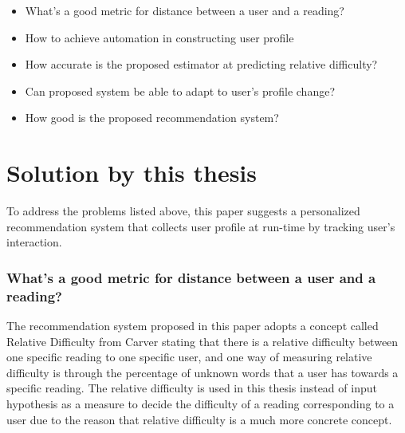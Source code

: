 \begin{itemize}
  \item What's a good metric for distance between a user and a reading?
  \vspace{10pt}
  \item How to achieve automation in constructing user profile
  \vspace{10pt}
  \item How accurate is the proposed estimator at predicting relative difficulty?
  \vspace{10pt}
  \item Can proposed system be able to adapt to user's profile change?
  \vspace{10pt}
  \item How good is the proposed recommendation system?
\end{itemize}

\section{Solution by this thesis}

To address the problems listed above, this paper suggests a personalized recommendation system that collects user profile at run-time by tracking user's interaction. 

\subsubsection{What's a good metric for distance between a user and a reading?}
\vspace{10pt}
The recommendation system proposed in this paper adopts a concept called Relative Difficulty from Carver \cite{Carver1994} stating that there is a relative difficulty between one specific reading to one specific user, and one way of measuring relative difficulty is through the percentage of unknown words that a user has towards a specific reading. The relative difficulty is used in this thesis instead of input hypothesis as a measure to decide the difficulty of a reading corresponding to a user due to the reason that relative difficulty is a much more concrete concept. 

